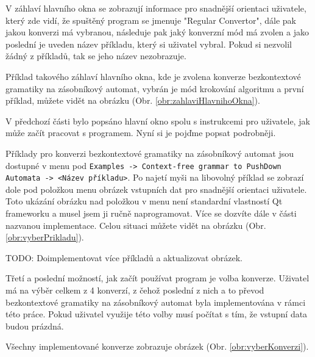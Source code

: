 

V záhlaví hlavního okna se zobrazují informace pro snadnější orientaci uživatele, který zde vidí, že spuštěný program se jmenuje "Regular Convertor", dále pak jakou konverzi má vybranou, následuje pak jaký konverzní mód má zvolen a jako poslední je uveden název příkladu, který si uživatel vybral. Pokud si nezvolil žádný z příkladů, tak se jeho název nezobrazuje.

Příklad takového záhlaví hlavního okna, kde je zvolena konverze bezkontextové gramatiky na zásobníkový automat, vybrán je mód krokování algoritmu a první příklad, můžete vidět na obrázku (Obr. \ref{obr:zahlaviHlavnihoOkna}).



V předchozí části bylo popsáno hlavní okno spolu s instrukcemi pro uživatele, jak může začít pracovat s programem. Nyní si je pojďme popsat podrobněji.


Příklady pro konverzi bezkontextové gramatiky na zásobníkový automat jsou dostupné v menu pod \texttt{Examples -> Context-free grammar to PushDown Automata -> <Název příkladu>}. Po najetí myši na libovolný příklad se zobrazí dole pod položkou menu obrázek vstupních dat pro snadnější orientaci uživatele. Toto ukázání obrázku nad položkou v menu není standardní vlastností Qt frameworku a musel jsem ji ručně naprogramovat. Více se dozvíte dále v části nazvanou implementace. Celou situaci můžete vidět na obrázku (Obr. \ref{obr:vyberPrikladu}).


TODO: Doimplementovat více příkladů a aktualizovat obrázek.


Třetí a poslední možností, jak začít používat program je volba konverze. Uživatel má na výběr celkem z 4 konverzí, z čehož poslední z nich a to převod bezkontextové gramatiky na zásobníkový automat byla implementována v rámci této práce. Pokud uživatel využije této volby musí počítat s tím, že vstupní data budou prázdná.

Všechny implementované konverze zobrazuje obrázek (Obr. \ref{obr:vyberKonverzi}).

